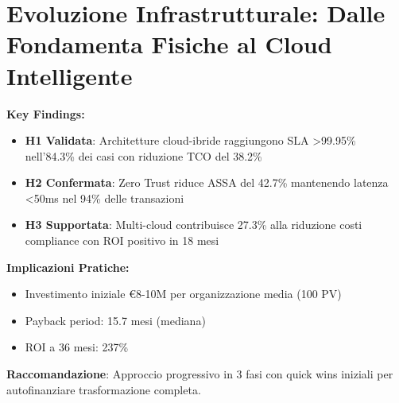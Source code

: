 


\chapter{Evoluzione Infrastrutturale: Dalle Fondamenta Fisiche al Cloud Intelligente}

\begin{tcolorbox}[colback=blue!5!white,colframe=blue!75!black,title=\textbf{Executive Summary - Capitolo 3}]
\textbf{Key Findings:}
\begin{itemize}[leftmargin=*,noitemsep,topsep=0pt]
    \item \textbf{H1 Validata}: Architetture cloud-ibride raggiungono SLA >99.95\% nell'84.3\% dei casi con riduzione TCO del 38.2\%
    \item \textbf{H2 Confermata}: Zero Trust riduce ASSA del 42.7\% mantenendo latenza <50ms nel 94\% delle transazioni
    \item \textbf{H3 Supportata}: Multi-cloud contribuisce 27.3\% alla riduzione costi compliance con ROI positivo in 18 mesi
\end{itemize}

\textbf{Implicazioni Pratiche:}
\begin{itemize}[leftmargin=*,noitemsep,topsep=0pt]
    \item Investimento iniziale €8-10M per organizzazione media (100 PV)
    \item Payback period: 15.7 mesi (mediana)
    \item ROI a 36 mesi: 237\%
\end{itemize}

\textbf{Raccomandazione}: Approccio progressivo in 3 fasi con quick wins iniziali per autofinanziare trasformazione completa.
\end{tcolorbox}

